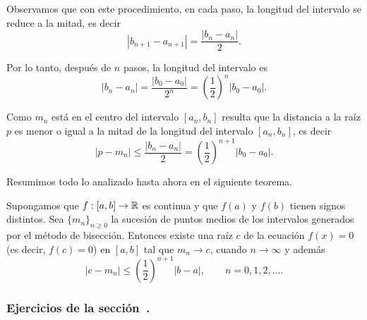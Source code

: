 Observamos que con este procedimiento, en cada paso, la longitud del intervalo se reduce a la mitad, es decir
\[
|b_{n+1} - a_{n+1}| = \frac{|b_n-a_n|}2.
\]

Por lo tanto, después de $n$ pasos, la longitud del intervalo es
\[
|b_n - a_n| = \frac{|b_0-a_0|}{2^n} = \left(\frac12\right)^n |b_0-a_0|.
\]

Como $m_n$ está en el centro del intervalo $[a_n,b_n]$ resulta que la distancia a la raíz $p$ es menor o igual a la mitad de la longitud del intervalo $[a_n,b_n]$, es decir
\[
|p - m_n| \le \frac{|b_n-a_n|}2 = \left(\frac12\right)^{n+1} |b_0-a_0|.
\]

Resumimos todo lo analizado hasta ahora en el siguiente teorema.

\begin{theorem}
Supongamos que $f:[a,b] \to \mathbb{R}$ es continua y que $f(a)$ y $f(b)$ tienen signos distintos.
Sea $\{ m_n \}_{n\ge 0}$ la sucesión de puntos medios de los intervalos generados por el método de bisección. Entonces existe una raíz $c$ de la ecuación $f(x)=  0$ (es decir, $f(c)=0$) en $[a,b]$ tal que $m_n \to c$, cuando $n\to\infty$ y además
\[
|c - m_n | \le \left(\frac12\right)^{n+1} |b-a|, \qquad n=0,1,2,\dots.
\]
\end{theorem}

\subsubsection*{Ejercicios de la sección~.}

\begin{enumerate}

\end{enumerate}

